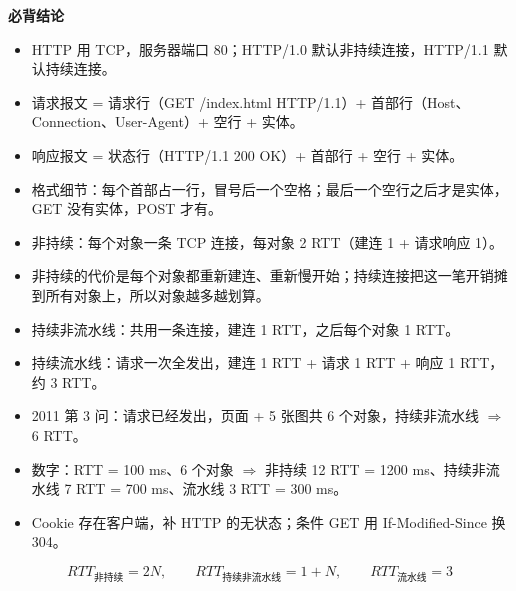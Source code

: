 \documentclass[10pt,a4paper]{ctexart}
\begin{document}



\textbf{必背结论}

\begin{itemize}

\item HTTP 用 TCP，服务器端口 80；HTTP/1.0 默认非持续连接，HTTP/1.1 默认持续连接。

\item 请求报文 = 请求行（GET /index.html HTTP/1.1）+ 首部行（Host、Connection、User-Agent）+ 空行 + 实体。

\item 响应报文 = 状态行（HTTP/1.1 200 OK）+ 首部行 + 空行 + 实体。

\item 格式细节：每个首部占一行，冒号后一个空格；最后一个空行之后才是实体，GET 没有实体，POST 才有。

\item 非持续：每个对象一条 TCP 连接，每对象 2 RTT（建连 1 + 请求响应 1）。

\item 非持续的代价是每个对象都重新建连、重新慢开始；持续连接把这一笔开销摊到所有对象上，所以对象越多越划算。

\item 持续非流水线：共用一条连接，建连 1 RTT，之后每个对象 1 RTT。

\item 持续流水线：请求一次全发出，建连 1 RTT + 请求 1 RTT + 响应 1 RTT，约 3 RTT。

\item 2011 第 3 问：请求已经发出，页面 + 5 张图共 6 个对象，持续非流水线 $\Rightarrow$ 6 RTT。

\item 数字：RTT = 100 ms、6 个对象 $\Rightarrow$ 非持续 12 RTT = 1200 ms、持续非流水线 7 RTT = 700 ms、流水线 3 RTT = 300 ms。

\item Cookie 存在客户端，补 HTTP 的无状态；条件 GET 用 If-Modified-Since 换 304。

\end{itemize}

\[
RTT_{非持续}=2N,\qquad RTT_{持续非流水线}=1+N,\qquad RTT_{流水线}=3
\]
\end{document}
